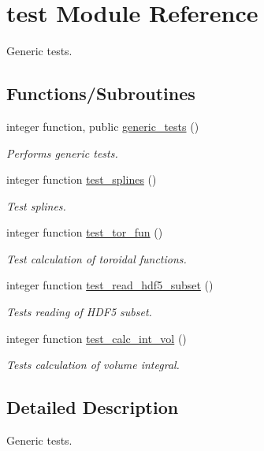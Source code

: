 \hypertarget{namespacetest}{}\section{test Module Reference}
\label{namespacetest}


Generic tests.  


\subsection*{Functions/\+Subroutines}
\begin{DoxyCompactItemize}
\item 
integer function, public \hyperlink{namespacetest_aca21ee464c0b1f4b617177afdde110ec}{generic\+\_\+tests} ()
\begin{DoxyCompactList}\small\item\em Performs generic tests. \end{DoxyCompactList}\item 
integer function \hyperlink{namespacetest_a53c6b3d654d4577af301fe3b04473d6a}{test\+\_\+splines} ()
\begin{DoxyCompactList}\small\item\em Test splines. \end{DoxyCompactList}\item 
integer function \hyperlink{namespacetest_ab595ec935321ea0b1168593fb88fad22}{test\+\_\+tor\+\_\+fun} ()
\begin{DoxyCompactList}\small\item\em Test calculation of toroidal functions. \end{DoxyCompactList}\item 
integer function \hyperlink{namespacetest_ac574f08ba400cd61070a6a6f13f6f7ee}{test\+\_\+read\+\_\+hdf5\+\_\+subset} ()
\begin{DoxyCompactList}\small\item\em Tests reading of H\+D\+F5 subset. \end{DoxyCompactList}\item 
integer function \hyperlink{namespacetest_a0d4cb791bf762b2e52260fea7644a3ee}{test\+\_\+calc\+\_\+int\+\_\+vol} ()
\begin{DoxyCompactList}\small\item\em Tests calculation of volume integral. \end{DoxyCompactList}\end{DoxyCompactItemize}


\subsection{Detailed Description}
Generic tests. 

